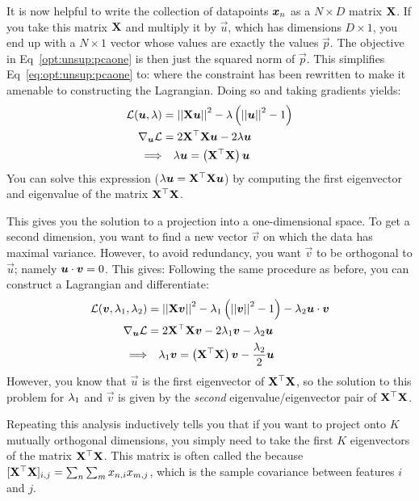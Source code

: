 It is now helpful to write the collection of datapoints ${\boldsymbol{x}}_n$ as a
$N \times D$ matrix $\text{\bf X}$.  If you take this matrix $\text{\bf X}$ and
multiply it by $\vec u$, which has dimensions $D \times 1$, you end up
with a $N \times 1$ vector whose values are exactly the values $\vec
p$.  The objective in Eq~\eqref{opt:unsup:pcaone} is then just the
squared norm of $\vec p$.  This simplifies
Eq~\eqref{eq:opt:unsup:pcaone} to:
%
%
where the constraint has been rewritten to make it amenable to
constructing the Lagrangian.  Doing so and taking gradients yields:
%
\begin{align}
\mathcal{L}(\boldsymbol{u}, \lambda) &=
  \left\vert\left\vert  \text{\bf X} \boldsymbol{u}  \right\vert\right\vert^2
  - \lambda \left( \left\vert\left\vert \boldsymbol{u} \right\vert\right\vert^2 - 1 \right) \\
\nabla_{\boldsymbol{u}} \mathcal{L} &=
  2 \text{\bf X}{}^\top\text{\bf X} \boldsymbol{u}  - 2 \lambda \boldsymbol{u} \\
\Longrightarrow & \quad\lambda \boldsymbol{u} =  \left(\text{\bf X}{}^\top\text{\bf X}\right)\boldsymbol{u}
\end{align}
%
You can solve this expression ($\lambda \boldsymbol{u} =  \text{\bf X}{}^\top\text{\bf X} \boldsymbol{u}$)
by computing the first eigenvector and eigenvalue of the matrix $\text{\bf X}{}^\top\text{\bf X}$.

This gives you the solution to a projection into a one-dimensional
space.  To get a second dimension, you want to find a new vector $\vec
v$ on which the data has maximal variance.  However, to avoid
redundancy, you want $\vec v$ to be orthogonal to $\vec u$; namely
$\boldsymbol{u} \cdot \boldsymbol{v} = 0$.  This gives:
%
%
Following the same procedure as before, you can construct a Lagrangian
and differentiate:
%
\begin{align}
\mathcal{L}(\boldsymbol{v}, \lambda_1, \lambda_2) &=
\left\vert\left\vert  \text{\bf X} \boldsymbol{v}  \right\vert\right\vert^2
  - \lambda_1 \left( \left\vert\left\vert \boldsymbol{v} \right\vert\right\vert^2 - 1 \right)
  - \lambda_2 \boldsymbol{u} \cdot \boldsymbol{v}\\
\nabla_{\boldsymbol{u}} \mathcal{L} &=
  2 \text{\bf X}{}^\top\text{\bf X} \boldsymbol{v}  - 2 \lambda_1 \boldsymbol{v} - \lambda_2 \boldsymbol{u}\\
\Longrightarrow & \quad\lambda_1 \boldsymbol{v} =  \left(\text{\bf X}{}^\top\text{\bf X}\right)\boldsymbol{v}
- \frac {\lambda_2} 2 \boldsymbol{u}
\end{align}
%
However, you know that $\vec u$ is the first eigenvector of $\text{\bf X}{}^\top\text{\bf X}$, so the solution to this problem for $\lambda_1$ and $\vec v$
is given by the \emph{second} eigenvalue/eigenvector pair of $\text{\bf X}{}^\top\text{\bf X}$.

Repeating this analysis inductively tells you that if you want to
project onto $K$ mutually orthogonal dimensions, you simply need to
take the first $K$ eigenvectors of the matrix $\text{\bf X}{}^\top\text{\bf X}$.  This
matrix is often called the  because
$[\text{\bf X}{}^\top\text{\bf X}]_{i,j} = \sum_n \sum_m x_{n,i} x_{m,j}$, which is the
sample covariance between features $i$ and $j$.

